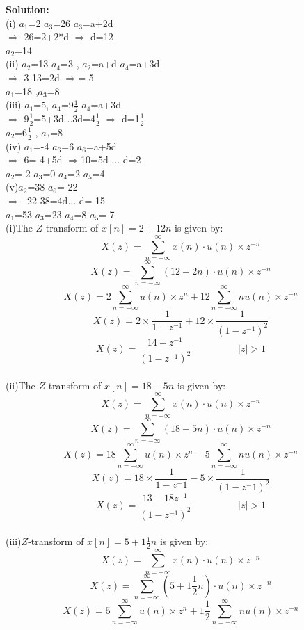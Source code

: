 \documentclass[journal,12pt,twocolumn]{IEEEtran}
\theoremstyle{remark}
\begin{document}
\textbf{Solution:}\\

(i) $a_1$=2 $a_3$=26 $a_3$=a+2d\\
$\Longrightarrow$ 26=2+2*d $\Longrightarrow$ d=12\\
$a_2$=14\\
(ii) $a_2$=13 $a_4$=3 , $a_2$=a+d $a_4$=a+3d \\
$\Longrightarrow$ 3-13=2d $\Longrightarrow$=-5\\ $a_1$=18 ,$a_3$=8\\
(iii) $a_1$=5, $a_4$=9\(\frac{1}{2}\) $a_4$=a+3d\\
$\Longrightarrow$ 9\(\frac{1}{2}\)=5+3d ..3d=4\(\frac{1}{2}\) $\Longrightarrow$ d=1\(\frac{1}{2}\)\\
$a_2$=6\(\frac{1}{2}\) , $a_3$=8\\
(iv) $a_1$=-4 $a_6$=6 $a_6$=a+5d\\
$\Longrightarrow$ 6=-4+5d $\Longrightarrow$10=5d ... d=2\\
$a_2$=-2 $a_3$=0 $a_4$=2 $a_5$=4\\
(v)$a_2$=38 $a_6$=-22 \\
$\Longrightarrow$ -22-38=4d... d=-15\\
$a_1$=53 $a_3$=23 $a_4$=8 $a_5$=-7\\
(i)The $Z$-transform of $x[n] = 2 + 12n$ is given by:
\[X(z)= \sum_{n=-\infty}^{\infty} x(n)\cdot u(n) \times z^{-n}\]
\[ X(z) = \sum_{n=-\infty}^{\infty} (12+2n)\cdot u(n) \times z^{-n} \]
\[X(z)=2 \sum_{n=-\infty}^{\infty}u(n)\times z^{n}+12 \sum_{n=-\infty}^{\infty}nu(n)\times z^{-n}\]
\[X(z)=2 \times \frac{1}{1-{z^{-1}}}+ 12 \times \frac{1}{(1-{z^{-1}})^2}\]
\[X(z)=\frac{14-{z^{-1}}}{(1-{z^{-1}})^2}  \hspace{2cm}  |z|>1 \]\\
(ii)The $Z$-transform of $x[n] = 18 - 5n$ is given by:
\[ X(z) = \sum_{n=-\infty}^{\infty} x(n)\cdot u(n)\times z^{-n} \]
\[ X(z) = \sum_{n=-\infty}^{\infty} (18-5n)\cdot u(n) \times z^{-n} \]
\[X(z)=18 \sum_{n=-\infty}^{\infty}u(n)\times z^{n} - 5\sum_{n=-\infty}^{\infty} nu(n)\times z^{-n}\]
\[X(z)=18 \times \frac{1}{1-{z^-1}} - 5 \times \frac{1}{(1-{z^-1})^2}\]
\[X(z)=\frac{13-{18z^{-1}}}{(1-{z^{-1}})^2}  \hspace{2cm}  |z|>1 \]\\
(iii)$Z$-transform of $x[n] = 5 + 1\frac{1}{2}n$ is given by:
\[ X(z) = \sum_{n=-\infty}^{\infty} x(n)\cdot u(n)\times z^{-n} \]
\[ X(z) = \sum_{n=-\infty}^{\infty} (5+1\frac{1}{2}n) \cdot u(n) \times z^{-n} \]
\[X(z)=5 \sum_{n=-\infty}^{\infty}u(n)\times z^{n}+1\frac{1}{2} \sum_{n=-\infty}^{\infty} nu(n) \times z^{-n}\]
\end{document}

